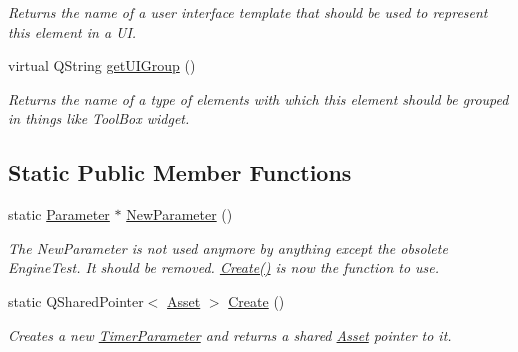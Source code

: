 \begin{DoxyCompactItemize}
\begin{DoxyCompactList}\small\item\em Returns the name of a user interface template that should be used to represent this element in a U\-I. \end{DoxyCompactList}\item 
\hypertarget{class_picto_1_1_timer_parameter_a58be44123fdcf4ded5593978139dd7f8}{virtual Q\-String \hyperlink{class_picto_1_1_timer_parameter_a58be44123fdcf4ded5593978139dd7f8}{get\-U\-I\-Group} ()}\label{class_picto_1_1_timer_parameter_a58be44123fdcf4ded5593978139dd7f8}

\begin{DoxyCompactList}\small\item\em Returns the name of a type of elements with which this element should be grouped in things like Tool\-Box widget. \end{DoxyCompactList}\end{DoxyCompactItemize}
\subsection*{Static Public Member Functions}
\begin{DoxyCompactItemize}
\item 
\hypertarget{class_picto_1_1_timer_parameter_a95810487116dddaf93daa5d662b7a655}{static \hyperlink{class_picto_1_1_parameter}{Parameter} $\ast$ \hyperlink{class_picto_1_1_timer_parameter_a95810487116dddaf93daa5d662b7a655}{New\-Parameter} ()}\label{class_picto_1_1_timer_parameter_a95810487116dddaf93daa5d662b7a655}

\begin{DoxyCompactList}\small\item\em The New\-Parameter is not used anymore by anything except the obsolete Engine\-Test. It should be removed. \hyperlink{class_picto_1_1_timer_parameter_a38644c50d39d9a48120179f6dd37cfa9}{Create()} is now the function to use. \end{DoxyCompactList}\item 
\hypertarget{class_picto_1_1_timer_parameter_a38644c50d39d9a48120179f6dd37cfa9}{static Q\-Shared\-Pointer$<$ \hyperlink{class_picto_1_1_asset}{Asset} $>$ \hyperlink{class_picto_1_1_timer_parameter_a38644c50d39d9a48120179f6dd37cfa9}{Create} ()}\label{class_picto_1_1_timer_parameter_a38644c50d39d9a48120179f6dd37cfa9}

\begin{DoxyCompactList}\small\item\em Creates a new \hyperlink{class_picto_1_1_timer_parameter}{Timer\-Parameter} and returns a shared \hyperlink{class_picto_1_1_asset}{Asset} pointer to it. \end{DoxyCompactList}\end{DoxyCompactItemize}
